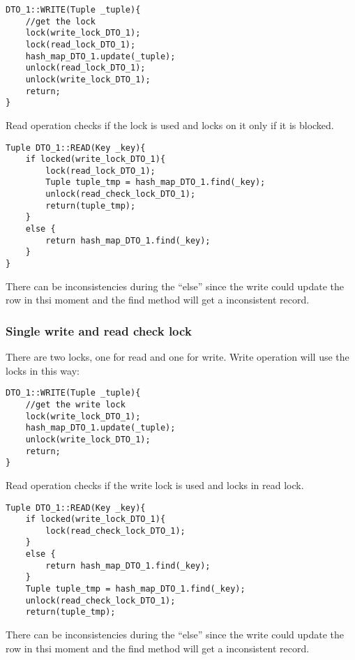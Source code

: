 \documentclass[a4paper]{article}
\begin{document}
\begin{verbatim}
DTO_1::WRITE(Tuple _tuple){
    //get the lock
    lock(write_lock_DTO_1);
    lock(read_lock_DTO_1);
    hash_map_DTO_1.update(_tuple);
    unlock(read_lock_DTO_1);
    unlock(write_lock_DTO_1); 
    return;
}
\end{verbatim}

Read operation checks if the lock is used and locks on it only if it is
blocked.

\begin{verbatim}
Tuple DTO_1::READ(Key _key){
    if locked(write_lock_DTO_1){
        lock(read_lock_DTO_1);        
        Tuple tuple_tmp = hash_map_DTO_1.find(_key);
        unlock(read_check_lock_DTO_1);
        return(tuple_tmp);
    }
    else {
        return hash_map_DTO_1.find(_key);
    }
}
\end{verbatim}

There can be inconsistencies during the ``else'' since the write could update
the row in thsi moment and the find method will get a inconsistent record.

\subsubsection{Single write and read check lock}
There are two locks, one for read and one for write. Write operation will use
the locks in this way:

\begin{verbatim}
DTO_1::WRITE(Tuple _tuple){
    //get the write lock
    lock(write_lock_DTO_1);
    hash_map_DTO_1.update(_tuple);
    unlock(write_lock_DTO_1);
    return;
}
\end{verbatim}

Read operation checks if the write lock is used and locks in read lock.

\begin{verbatim}
Tuple DTO_1::READ(Key _key){
    if locked(write_lock_DTO_1){
        lock(read_check_lock_DTO_1);
    }
    else {
        return hash_map_DTO_1.find(_key);
    }
    Tuple tuple_tmp = hash_map_DTO_1.find(_key);
    unlock(read_check_lock_DTO_1);
    return(tuple_tmp);
\end{verbatim}

There can be inconsistencies during the ``else'' since the write could update
the row in thsi moment and the find method will get a inconsistent record.
\end{document}
